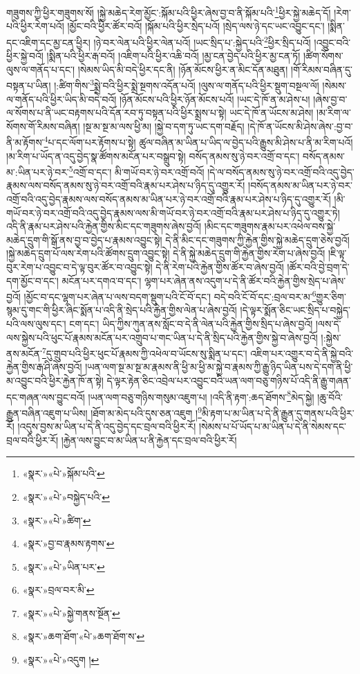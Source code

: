 གཟུགས་ཀྱི་ཕྱིར་གཟུགས་སོ། །སྐྱེ་མཆེད་རེག་མྱོང་:སྐོམ་པའི་ཕྱིར་ཞེས་བྱ་བ་ནི་སྐོམ་པའི་\footnote{«སྣར་»«པེ་»སྐོམ་པའི་}ཕྱིར་སྐྱེ་མཆེད་དོ། །རེག་པའི་ཕྱིར་རེག་པའོ། །མྱོང་བའི་ཕྱིར་ཚོར་བའོ། །སྐོམ་པའི་ཕྱིར་སྲེད་པའོ། །སྲེད་ལས་ཉེ་དང་ཡང་འབྱུང་དང་། །སྨིན་དང་འཇིག་དང་མྱ་ངན་ཕྱིར། །ཉེ་བར་ལེན་པའི་ཕྱིར་ལེན་པའོ། །ཡང་སྲིད་པ་:སྐྱེད་པའི་\footnote{«སྣར་»«པེ་»བསྐྱེད་པའི་}ཕྱིར་སྲིད་པའོ། །འབྱུང་བའི་ཕྱིར་སྐྱེ་བའོ། །སྨིན་པའི་ཕྱིར་རྒ་བའོ། །འཇིག་པའི་ཕྱིར་འཆི་བའོ། །མྱ་ངན་བྱེད་པའི་ཕྱིར་མྱ་ངན་ཏོ། །ཚིག་སོགས་ལུས་ལ་གནོད་པ་དང་། །སེམས་ཡིད་མི་བདེ་ཕྱིར་དང་ནི། །ཉོན་མོངས་ཕྱིར་ན་མིང་དོན་མཐུན། །གོ་རིམས་བཞིན་དུ་བསྟན་པ་ཡིན། །:ཚིག་གིས་\footnote{«སྣར་»«པེ་»ཚིག་}སྨྲེ་བའི་ཕྱིར་སྨྲེ་སྔགས་འདོན་པའོ། །ལུས་ལ་གནོད་པའི་ཕྱིར་སྡུག་བསྔལ་ལོ། །སེམས་ལ་གནོད་པའི་ཕྱིར་ཡིད་མི་བདེ་བའོ། །ཉོན་མོངས་པའི་ཕྱིར་ཉོན་མོངས་པའོ། །ཡང་དེ་ཁོ་ན་མ་ཤེས་པ། །ཞེས་བྱ་བ་ལ་སོགས་པ་ནི་ཡང་བརྟགས་པའི་དོན་རབ་ཏུ་བསྟན་པའི་ཕྱིར་སྨྲས་པ་སྟེ། ཡང་དེ་ཁོ་ན་ཡོངས་མ་ཤེས། །མ་རིག་ལ་སོགས་གོ་རིམས་བཞིན། །སྔ་མ་སྔ་མ་ལས་ཕྱི་མ། །སྐྱེ་བ་དག་ཏུ་ཡང་དག་བརྗོད། །དེ་ཁོ་ན་ཡོངས་མི་ཤེས་ཞེས་:བྱ་བ་ནི་མ་རྟོགས་\footnote{«སྣར་»བྱ་བ་རྣམས་རྟགས་}པ་དང་ལོག་པར་རྟོགས་པ་སྟེ། ཚུལ་བཞིན་མ་ཡིན་པ་ཡིད་ལ་བྱེད་པའི་རྒྱུས་མི་ཤེས་པ་ནི་མ་རིག་པའོ། །མ་རིག་པ་ཡོད་ན་འདུ་བྱེད་སྣ་ཚོགས་མངོན་པར་བསྒྲུབ་སྟེ། བསོད་ནམས་སུ་ཉེ་བར་འགྲོ་བ་དང་། བསོད་ནམས་མ་:ཡིན་པར་ཉེ་བར་\footnote{«སྣར་»«པེ་»ཡིན་པར་}འགྲོ་བ་དང་། མི་གཡོ་བར་ཉེ་བར་འགྲོ་བའོ། །དེ་ལ་བསོད་ནམས་སུ་ཉེ་བར་འགྲོ་བའི་འདུ་བྱེད་རྣམས་ལས་བསོད་ནམས་སུ་ཉེ་བར་འགྲོ་བའི་རྣམ་པར་ཤེས་པ་ཉིད་དུ་འགྱུར་རོ། །བསོད་ནམས་མ་ཡིན་པར་ཉེ་བར་འགྲོ་བའི་འདུ་བྱེད་རྣམས་ལས་བསོད་ནམས་མ་ཡིན་པར་ཉེ་བར་འགྲོ་བའི་རྣམ་པར་ཤེས་པ་ཉིད་དུ་འགྱུར་རོ། །མི་གཡོ་བར་ཉེ་བར་འགྲོ་བའི་འདུ་བྱེད་རྣམས་ལས་མི་གཡོ་བར་ཉེ་བར་འགྲོ་བའི་རྣམ་པར་ཤེས་པ་ཉིད་དུ་འགྱུར་ཏེ། འདི་ནི་རྣམ་པར་ཤེས་པའི་རྐྱེན་གྱིས་མིང་དང་གཟུགས་ཞེས་བྱའོ། །མིང་དང་གཟུགས་རྣམ་པར་འཕེལ་བས་སྐྱེ་མཆེད་དྲུག་གི་སྒོ་ནས་བྱ་བ་བྱེད་པ་རྣམས་འབྱུང་སྟེ། དེ་ནི་མིང་དང་གཟུགས་ཀྱི་རྐྱེན་གྱིས་སྐྱེ་མཆེད་དྲུག་ཅེས་བྱའོ། །སྐྱེ་མཆེད་དྲུག་པོ་ལས་རེག་པའི་ཚོགས་དྲུག་འབྱུང་སྟེ། དེ་ནི་སྐྱེ་མཆེད་དྲུག་གི་རྐྱེན་གྱིས་རེག་པ་ཞེས་བྱའོ། །ཇི་ལྟ་བུར་རེག་པ་འབྱུང་བ་དེ་ལྟ་བུར་ཚོར་བ་འབྱུང་སྟེ། དེ་ནི་རེག་པའི་རྐྱེན་གྱིས་ཚོར་བ་ཞེས་བྱའོ། །ཚོར་བའི་བྱེ་བྲག་དེ་དག་མྱོང་བ་དང་། མངོན་པར་དགའ་བ་དང་། ལྷག་པར་ཞེན་ནས་འདུག་པ་དེ་ནི་ཚོར་བའི་རྐྱེན་གྱིས་སྲེད་པ་ཞེས་བྱའོ། །མྱོང་བ་དང་ལྷག་པར་ཞེན་པ་ལས་བདག་སྡུག་པའི་ངོ་བོ་དང་། བདེ་བའི་ངོ་བོ་དང་:བྲལ་བར་མ་\footnote{«སྣར་»བྲལ་བར་མི་}གྱུར་ཅིག་སྙམ་དུ་གང་གི་ཕྱིར་ཞིང་སྨོན་པ་འདི་ནི་སྲེད་པའི་རྐྱེན་གྱིས་ལེན་པ་ཞེས་བྱའོ། །དེ་ལྟར་སྨོན་ཅིང་ཡང་སྲིད་པ་བསྐྱེད་པའི་ལས་ལུས་དང་། ངག་དང་། ཡིད་ཀྱིས་ཀུན་ནས་སློང་བ་དེ་ནི་ལེན་པའི་རྐྱེན་གྱིས་སྲིད་པ་ཞེས་བྱའོ། །ལས་དེ་ལས་སྐྱེས་པའི་ཕུང་པོ་རྣམས་མངོན་པར་འགྲུབ་པ་གང་ཡིན་པ་དེ་ནི་སྲིད་པའི་རྐྱེན་གྱིས་སྐྱེ་བ་ཞེས་བྱའོ། །:སྐྱེས་ནས་མངོན་\footnote{«སྣར་»«པེ་»སྐྱེ་གནས་སྔོན་}དུ་གྲུབ་པའི་ཕྱིར་ཕུང་པོ་རྣམས་ཀྱི་འཕེལ་བ་ཡོངས་སུ་སྨིན་པ་དང་། འཇིག་པར་འགྱུར་བ་དེ་ནི་སྐྱེ་བའི་རྐྱེན་གྱིས་རྒ་ཤི་ཞེས་བྱའོ། །ཡན་ལག་སྔ་མ་སྔ་མ་རྣམས་ནི་ཕྱི་མ་ཕྱི་མ་སྐྱེ་བ་རྣམས་ཀྱི་རྒྱུ་ཉིད་ཡིན་པས་དེ་དག་ནི་ཕྱི་མ་འབྱུང་བའི་ཕྱིར་རྐྱེན་ཁོ་ན་སྟེ། དེ་ལྟར་རྟེན་ཅིང་འབྲེལ་པར་འབྱུང་བའི་ཡན་ལག་བཅུ་གཉིས་པོ་འདི་ནི་རྒྱུ་གཞན་དང་གཞན་ལས་བྱུང་བའོ། །ཡན་ལག་བཅུ་གཉིས་གསུམ་འཇུག་པ། །འདི་ནི་རྟག་:ཆད་ཐོགས་\footnote{«སྣར་»ཆག་ཐོག་«པེ་»ཆག་ཐོག་ས་}མེད་སྐྱེ། །ཆུ་བོའི་རྒྱུན་བཞིན་འཇུག་པ་ཡིས། །ཐོག་མ་མེད་པའི་དུས་ཅན་འཇུག །\footnote{«སྣར་»«པེ་»འདུག །}མི་རྟག་པ་མ་ཡིན་པ་དེ་ནི་རྒྱུན་དུ་གནས་པའི་ཕྱིར་རོ། །འདུས་བྱས་མ་ཡིན་པ་དེ་ནི་འདུ་བྱེད་དང་བྲལ་བའི་ཕྱིར་རོ། །སེམས་པ་པོ་ཡོད་པ་མ་ཡིན་པ་དེ་ནི་སེམས་དང་བྲལ་བའི་ཕྱིར་རོ། །རྐྱེན་ལས་བྱུང་བ་མ་ཡིན་པ་ནི་རྐྱེན་དང་བྲལ་བའི་ཕྱིར་རོ། 